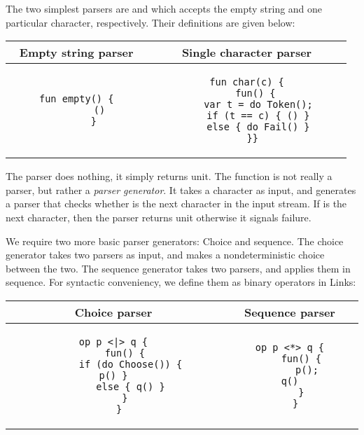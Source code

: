 The two simplest parsers are  and  which accepts the empty string and one particular character, respectively. Their definitions are given below:
\begin{figure*}[h]
    \centering
\begin{tabular}{c|c}
Empty string parser & Single character parser \\
\hline
    \begin{subfigure}[c]{0.35\textwidth}
        \centering
\begin{lstlisting}[style=links]
      fun empty() {
        ()
      }
\end{lstlisting}
    \end{subfigure}%
    &
    \begin{subfigure}[c]{0.36\textwidth}
        \centering
\begin{lstlisting}[style=links]
  fun char(c) {
   fun() {
    var t = do Token();
    if (t == c) { () }
    else { do Fail() }
  }}
\end{lstlisting}
    \end{subfigure}
\end{tabular}
\end{figure*}
The parser  does nothing, it simply returns unit. The function  is not really a parser, but rather a \emph{parser generator}. It takes a character  as input, and generates a parser that checks whether  is the next character in the input stream. If  is the next character, then the parser returns unit otherwise it signals failure.

We require two more basic parser generators: Choice and sequence. The choice generator takes two parsers as input, and makes a nondeterministic choice between the two. The sequence generator takes two parsers, and applies them in sequence. For syntactic conveniency, we define them as binary operators in Links:
\begin{figure*}[h]
    \centering
\begin{tabular}{c | c}
Choice parser & Sequence parser \\
\hline
    \begin{subfigure}[c]{0.35\textwidth}
        \centering
\begin{lstlisting}[style=links]
  op p <|> q {
    fun() {
      if (do Choose()) { p() }
      else { q() }
    }
  }
\end{lstlisting}
    \end{subfigure}%
    &
    \begin{subfigure}[c]{0.36\textwidth}%
        \centering
\begin{lstlisting}[style=links]
  op p <*> q {
    fun() {
      p(); q()
    }
  }
\end{lstlisting}
    \end{subfigure}
\end{tabular}
\end{figure*}


